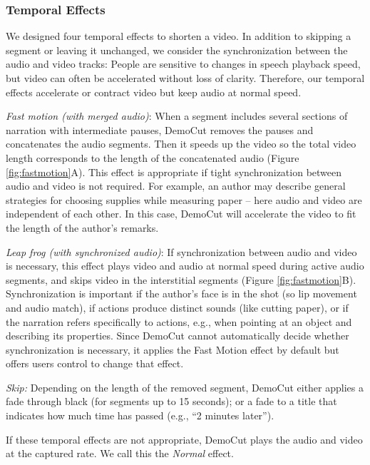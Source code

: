 \subsubsection{Temporal Effects}
We designed four temporal effects to shorten a video. In addition to skipping a segment or leaving it unchanged, we consider the synchronization between the audio and video tracks: People are sensitive to changes in speech playback speed, but video can often be accelerated without loss of clarity. Therefore,
our temporal effects accelerate or contract video but keep audio at normal speed.

{\em Fast motion (with merged audio)}: When a segment includes several sections of narration with intermediate pauses, DemoCut removes the pauses and concatenates the audio segments. Then it speeds up the video so the total video length corresponds to the length of the concatenated audio (Figure \ref{fig:fastmotion}A). This effect is appropriate if tight synchronization between audio and video is not required. For example, an author may describe general strategies for choosing supplies while measuring paper -- here audio and video are independent of each other. In this case, DemoCut will accelerate the video %
to fit the length of the author's remarks.

{\em Leap frog (with synchronized audio)}: If synchronization between audio and video is necessary, this effect plays video and audio at normal speed during active audio segments, and skips video in the interstitial segments (Figure \ref{fig:fastmotion}B).
Synchronization is important if the author's face is in the shot (so lip movement and audio match), if actions produce distinct sounds (like cutting paper), or if the narration refers specifically to actions, e.g., when pointing at an object and describing its properties.
Since DemoCut cannot automatically decide whether synchronization is necessary,
it applies the Fast Motion effect by default but offers users control to change that effect.

{\em Skip:} Depending on the length of the removed segment, DemoCut either applies a fade through black (for segments up to 15 seconds); or a fade to a title that indicates how much time has passed (e.g., ``2 minutes later'').

If these temporal effects are not appropriate, DemoCut plays the audio and video at the captured rate. We call this the {\em Normal} effect.

